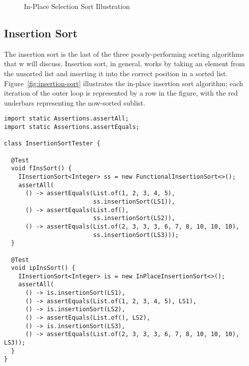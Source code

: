 \begin{figure}[H]
\caption{In-Place Selection Sort Illustration}
\label{fig:selection-sort}
\end{figure}

\subsection{Insertion Sort}
The insertion sort is the last of the three poorly-performing sorting algorithms that w will discuss. 
Insertion sort, in general, works by taking an element from the unsorted list and inserting it into the correct position in a sorted list. 
Figure~\ref{fig:insertion-sort} illustrates the in-place insertion sort algorithm; each iteration of the outer loop is represented by a row in the figure, with the red underbars representing the now-sorted sublist.

\enlargethispage{-7\baselineskip}
\begin{lstlisting}[language=MyJava]
import static Assertions.assertAll;
import static Assertions.assertEquals;

class InsertionSortTester {

  @Test
  void fInsSort() {
    IInsertionSort<Integer> ss = new FunctionalInsertionSort<>();
    assertAll(
      () -> assertEquals(List.of(1, 2, 3, 4, 5), 
                         ss.insertionSort(LS1)),
      () -> assertEquals(List.of(), 
                         ss.insertionSort(LS2)),
      () -> assertEquals(List.of(2, 3, 3, 3, 6, 7, 8, 10, 10, 10), 
                         ss.insertionSort(LS3)));
  }

  @Test
  void ipInsSort() {
    IInsertionSort<Integer> is = new InPlaceInsertionSort<>();
    assertAll(
      () -> is.insertionSort(LS1),
      () -> assertEquals(List.of(1, 2, 3, 4, 5), LS1),
      () -> is.insertionSort(LS2),
      () -> assertEquals(List.of(), LS2),
      () -> is.insertionSort(LS3),
      () -> assertEquals(List.of(2, 3, 3, 3, 6, 7, 8, 10, 10, 10), LS3));
  }
}
\end{lstlisting}

